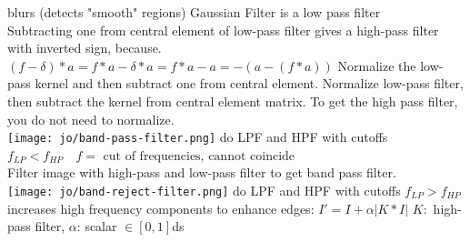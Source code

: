 blurs (detects "smooth" regions) Gaussian Filter is a low pass filter \\
 Subtracting one from central element of low-pass filter gives a high-pass filter with inverted sign, because.\\
$(f - \delta) * a = f * a - \delta * a = f * a - a = - (a - (f * a))$ Normalize the low-pass kernel and then subtract one from central element. Normalize low-pass filter, then subtract the kernel from central element matrix. To get the high pass filter, you do not need to normalize.\\
\texttt{[image: jo/band-pass-filter.png]}
do LPF and HPF with cutoffs $f_{LP} < f_{HP} \quad f = \text{ cut of frequencies, cannot coincide}$\\
Filter image with high-pass and low-pass filter to get band pass filter. \\
 \texttt{[image: jo/band-reject-filter.png]}
do LPF and HPF with cutoffs $f_{LP} > f_{HP}$\\
 increases high frequency components to enhance edges: $I' = I + \alpha |K * I|$ $K:$ high-pass filter, $\alpha$: scalar $\in [0, 1]$ds